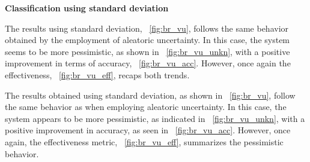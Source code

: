 \vspace{0.3cm}
\textbf{Classification using standard deviation}
\vspace{0.1cm}

The results using standard deviation, \Fig~\ref{fig:br_vu}, follows the same behavior obtained by the employment of aleatoric uncertainty. In this case, the system seems to be more pessimistic, as shown in \Fig~\ref{fig:br_vu_unkn}, with a positive improvement in terms of accuracy, \Fig~\ref{fig:br_vu_acc}. However, once again the effectiveness, \Fig~\ref{fig:br_vu_eff}, recaps both trends.

The results obtained using standard deviation, as shown in \Fig~\ref{fig:br_vu}, follow the same behavior as when employing aleatoric uncertainty. In this case, the system appears to be more pessimistic, as indicated in \Fig~\ref{fig:br_vu_unkn}, with a positive improvement in accuracy, as seen in \Fig~\ref{fig:br_vu_acc}. However, once again, the effectiveness metric, \Fig~\ref{fig:br_vu_eff}, summarizes the pessimistic behavior.

